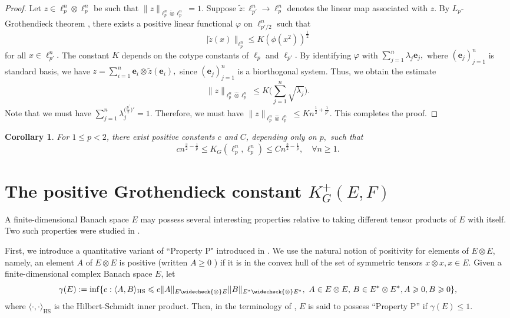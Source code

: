 \documentclass[a4paper,oneside,11pt, reqno]{amsart}
\numberwithin{equation}{section}
\newtheorem{corollary}[theorem]{Corollary}
\theoremstyle{plain}
\begin{document}
 \begin{proof}
     Let $z\in \ell_p^{n}\otimes\ell_p^{n} $ be such that $\|z\|_{\ell_p^{n}\check{\otimes}\ell_p^{n}}=1.$ Suppose $\widetilde z:\ell_{p'}^{n}\to\ell_p^{n}$ denotes the linear map associated with $z.$ By $L_p$-Grothendieck theorem \cite{Maurey}, there exists a positive linear functional $\varphi$ on $\ell_{p'/2}^n$ such that  
     $$|\widetilde{z}(x)\|_{\ell_p^{n}}\leqslant K(\phi(x^2))^{\frac{1}{2}}$$ 
     for all $x\in\ell_{p'}^{n}.$ The constant $K$ depends on the cotype constants of $\ell_{p}$ and $\ell_{p'}.$ By identifying $\varphi$ with  $\sum_{j=1}^n\lambda_j\mathbf{e}_j,$ where $
(\mathbf{e}_j)_{j=1}^n$ is standard basis, we have $z=\sum_{i=1}^n\mathbf{e}_i\otimes \widetilde{z}(\mathbf{e}_i),$ since $(\mathbf{e}_j)_{j=1}^n$ is a biorthogonal system. Thus, we obtain the estimate
\[\|z\|_{\ell_p^{n}\hat{\otimes}\ell_p^{n}}\leqslant K\Big(\sum_{j=1}^n\sqrt{\lambda_j}\Big).\] 
Note that we must have $\sum_{j=1}^n\lambda_j^{\big(\frac{p^\prime}{2}\big)'}=1.$  Therefore, we must have
$\|z\|_{\ell_p^{n}\hat{\otimes}\ell_p^{n}}\leqslant Kn ^{\frac{1}{2}+\frac{1}{p'}}.$
This completes the proof.
\end{proof}
 \begin{corollary}
    For $1\leqslant p<2$, there exist positive constants $c$ and $C$, depending only on $p,$ such that 
    \[cn^{\frac{3}{2}-\frac{1}{p}}\leqslant K_G(\ell_p^{n},\ell_p^{n})\leqslant Cn^{\frac{3}{2}-\frac{1}{p}},\quad \forall n\geqslant 1.\]
 \end{corollary}
\section{The positive Grothendieck constant $K^{+}_G(E,F)$} \label{S5}
A finite-dimensional Banach space $E$ may possess several interesting properties relative to taking different tensor products of $E$ with itself. Two such properties were studied in \cite{BM}. 

First, we introduce a quantitative variant of ``Property P" introduced in \cite{BM}. We use the natural notion of positivity for elements of $E \otimes E$, namely, an element $A$ of $E \otimes E$ is positive (written $A \geq 0$ ) if it is in the convex hull of the set of symmetric tensors $x \otimes x, x \in E$. Given a finite-dimensional complex Banach space $E$, let 
\[\gamma(E):= \inf \{c: \langle A, B\rangle_{\text{HS}} \leqslant c\|A\|_{E\widecheck{\otimes}E} \| B \|_{E^*\widecheck{\otimes} E^*},\,\, A \in E \otimes E,\,B \in E^* \otimes E^*,A \geqslant 0, B \geqslant 0\},\] where $\langle \cdot, \cdot \rangle_{\text{HS}}$ is the Hilbert-Schmidt inner product. Then, in the terminology of \cite{BM}, $E$ is said to possess ``Property P'' if $\gamma(E) \leq 1$. 
\end{document}
